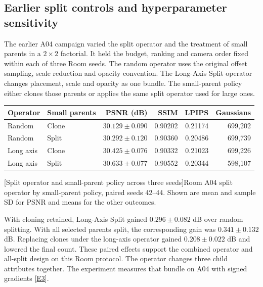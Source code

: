 \subsection{Earlier split controls and hyperparameter sensitivity}
The earlier A04 campaign varied the split operator and the treatment of small parents in a $2\times2$ factorial. It held the budget, ranking and camera order fixed within each of three Room seeds. The random operator uses the original offset sampling, scale reduction and opacity convention. The Long-Axis Split operator changes placement, scale and opacity as one bundle. The small-parent policy either clones those parents or applies the same split operator used for large ones.

\begin{center}\begin{minipage}{\linewidth}
\small\begin{tabular*}{\linewidth}{@{\extracolsep{\fill}}llrrrr@{}}
\toprule
Operator & Small parents & PSNR (dB) & SSIM & LPIPS & Gaussians\\
\midrule
Random & Clone & $30.129\pm0.090$ & 0.90202 & 0.21174 & 699,202\\
Random & Split & $30.292\pm0.120$ & 0.90360 & 0.20486 & 699,739\\
Long axis & Clone & $30.425\pm0.076$ & 0.90332 & 0.21023 & 699,226\\
Long axis & Split & $30.633\pm0.077$ & 0.90552 & 0.20344 & 598,107\\
\bottomrule
\end{tabular*}\par
{}[Split operator and small-parent policy across three seeds]{Room A04 split operator by small-parent policy, paired seeds 42--44. Shown are mean and sample SD for PSNR and means for the other outcomes.}\label{tab:split-ablation}
\end{minipage}\end{center}

With cloning retained, Long-Axis Split gained $0.296\pm0.082$ dB over random splitting. With all selected parents split, the corresponding gain was $0.341\pm0.132$ dB. Replacing clones under the long-axis operator gained $0.208\pm0.022$ dB and lowered the final count. These paired effects support the combined operator and all-split design on this Room protocol. The operator changes three child attributes together. The experiment measures that bundle on A04 with signed gradients [\hyperlink{evE3}{E3}].

